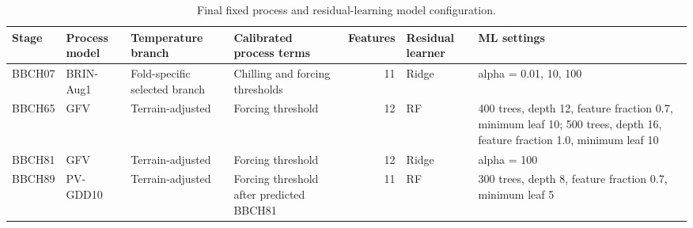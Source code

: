\documentclass[10pt]{article}
\begin{document}
\begin{table}[!htbp]
\centering
\caption{Final fixed process and residual-learning model configuration.}
\label{tab:supp_fixed_configuration}
\footnotesize
\begin{tabularx}{\textwidth}{llllrlY}
\toprule
Stage & Process model & Temperature branch & Calibrated process terms & Features & Residual learner & ML settings \\
\midrule
BBCH07 & BRIN-Aug1 & Fold-specific selected branch & Chilling and forcing thresholds & 11 & Ridge & alpha = 0.01, 10, 100 \\
BBCH65 & GFV & Terrain-adjusted & Forcing threshold & 12 & RF & 400 trees, depth 12, feature fraction 0.7, minimum leaf 10; 500 trees, depth 16, feature fraction 1.0, minimum leaf 10 \\
BBCH81 & GFV & Terrain-adjusted & Forcing threshold & 12 & Ridge & alpha = 100 \\
BBCH89 & PV-GDD10 & Terrain-adjusted & Forcing threshold after predicted BBCH81 & 11 & RF & 300 trees, depth 8, feature fraction 0.7, minimum leaf 5 \\
\bottomrule
\end{tabularx}
\end{table}
\end{document}
